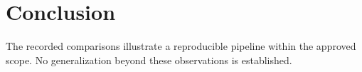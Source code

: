\section{Conclusion}
The recorded comparisons illustrate a reproducible pipeline within the approved scope. No generalization beyond these observations is established.
